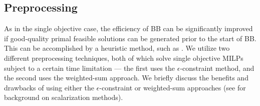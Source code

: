 \documentclass[11.5pt]{article}
\begin{document}


\subsection{Preprocessing} \label{sec:preprocessing}  As in the single objective case, the efficiency of BB can be significantly improved if good-quality primal feasible solutions can be generated prior to the start of BB. This can be accomplished by a heuristic method, such as \citep{soylu2015heuristic,leitner2016ilp}. We utilize two different preprocessing techniques, both of which solve single objective MILPs subject to a certain time limitation --- the first uses the $\epsilon$-constraint method, and the second uses the weighted-sum approach. We briefly discuss the benefits and drawbacks of using either the $\epsilon$-constraint or weighted-sum approaches (see \citep{ehrgott2005multicriteria} for background on scalarization methods).

\end{document}

